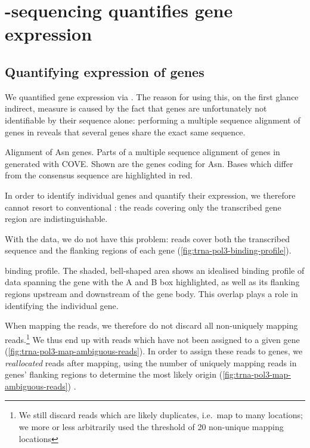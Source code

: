 \chapter{ -sequencing quantifies  gene
expression}

\section{Quantifying expression of \trna genes}

We quantified \trna gene expression via  \chipseq. The reason for using
this, on the first glance indirect, measure is caused by the fact that \trna
genes are unfortunately not identifiable by their sequence alone: performing a
multiple sequence alignment of \trna genes in \mmu reveals that several \trna
genes share the exact same sequence.

    {\footnotesize
    }
    {Alignment of Asn \trna genes.}
    {Parts of a multiple sequence alignment of \trna genes in \mmu generated
    with COVE\@. Shown are the \trna genes coding for Asn. Bases which differ
    from the consensus sequence are highlighted in red.}

In order to identify individual \trna genes and quantify their expression, we
therefore cannot resort to conventional \rnaseq: the \rna reads covering only
the transcribed gene region are indistinguishable.

With the  \chipseq data, we do not have this problem: reads cover both the
transcribed sequence and the flanking regions of each gene
(\cref{fig:trna-pol3-binding-profile}).

    {\trna {} \chip binding profile.}
    {The shaded, bell-shaped area shows an idealised binding profile of \chipseq
    data spanning the \trna gene with the A and B box highlighted, as well as
    its flanking regions upstream and downstream of the gene body. This overlap
    plays a role in identifying the individual gene.}

When mapping the reads, we therefore do not discard all non-uniquely mapping
reads.\footnote{We still discard reads which are likely \pcr duplicates, i.e.\
map to many locations; we more or less arbitrarily used the threshold of
\num{20} non-unique mapping locations} We thus end up with reads which have not
been assigned to a given \trna gene (\cref{fig:trna-pol3-map-ambiguous-reads}).
In order to assign these reads to \trna genes, we \emph{reallocated} reads after
mapping, using the number of uniquely mapping reads in \trna genes’ flanking
regions to determine the most likely origin
(\cref{fig:trna-pol3-map-ambiguous-reads}) \citep{Kutter:2011}.

